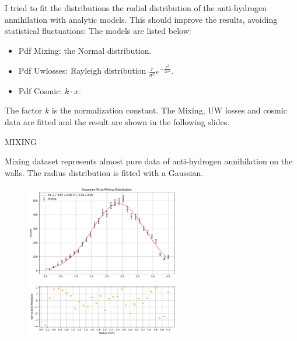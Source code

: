\documentclass[9pt]{beamer}
\author{Adriano Del Vincio, Germano Bonomi,\\ Simone Stracka}
\title[Alpha 2]{Studying Annihilation Distributions \hrule}
\institute{University of Brescia, INFN Pisa}
\date{07/11/2023}
\begin{document}
\begin{frame}
\titlepage
\end{frame}


\begin{frame}{}

I tried to fit the distributions the radial distribution of the anti-hydrogen annihilation with analytic models. This should improve the results, avoiding statistical fluctuations:
The models are listed below:
\begin{itemize}
\item Pdf Mixing: the Normal distribution.
\item Pdf Uwlosses: Rayleigh distribution $\frac{r}{\sigma^{2}} e^{-\frac{r^{2}}{2 \sigma^{2}}}$.
\item Pdf Cosmic: $k \cdot x$.
\end{itemize}

The factor $k$ is the normalization constant. The Mixing, UW losses and cosmic data are fitted and the result are shown in the following slides.
\end{frame}

\begin{frame}{MIXING}

Mixing dataset represents almost pure data of anti-hydrogen annihilation on the walls. The radius distribution is fitted with a Gaussian.

\begin{figure}
\vspace{-2pt}
\includegraphics[width = 0.6\textwidth]{./SingleModel/GaussianFitMixing.pdf}
\end{figure}

\end{frame}
\end{document}
